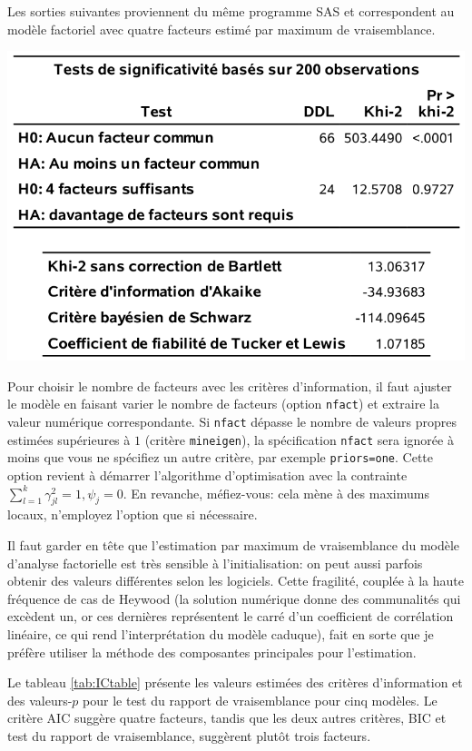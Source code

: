 \documentclass[
  11pt,
  letterpaper,
]{book}
\theoremstyle{definition}
\theoremstyle{definition}
\theoremstyle{definition}
\theoremstyle{definition}
\theoremstyle{remark}
\begin{document}
Les sorties suivantes proviennent du même programme SAS et correspondent au modèle factoriel avec quatre facteurs estimé par maximum de vraisemblance.

\begin{center}\includegraphics[width=0.7\linewidth]{figures/01-facto-e4} \end{center}

Pour choisir le nombre de facteurs avec les critères d'information, il faut ajuster le modèle en faisant varier le nombre de facteurs (option \texttt{nfact}) et extraire la valeur numérique correspondante. Si \texttt{nfact} dépasse le nombre de valeurs propres estimées supérieures à \(1\) (critère \texttt{mineigen}), la spécification \texttt{nfact} sera ignorée à moins que vous ne spécifiez un autre critère, par exemple \texttt{priors=one}. Cette option revient à démarrer l'algorithme d'optimisation avec la contrainte \(\sum_{l=1}^k \gamma_{jl}^2=1, \psi_j=0\). En revanche, méfiez-vous: cela mène à des maximums locaux, n'employez l'option que si nécessaire.

Il faut garder en tête que l'estimation par maximum de vraisemblance du modèle d'analyse factorielle est très sensible à l'initialisation: on peut aussi parfois obtenir des valeurs différentes selon les logiciels. Cette fragilité, couplée à la haute fréquence de cas de Heywood (la solution numérique donne des communalités qui excèdent un, or ces dernières représentent le carré d'un coefficient de corrélation linéaire, ce qui rend l'interprétation du modèle caduque), fait en sorte que je préfère utiliser la méthode des composantes principales pour l'estimation.

Le tableau \ref{tab:ICtable} présente les valeurs estimées des critères d'information et des valeurs-\(p\) pour le test du rapport de vraisemblance pour cinq modèles. Le critère AIC suggère quatre facteurs, tandis que les deux autres critères, BIC et test du rapport de vraisemblance, suggèrent plutôt trois facteurs.
\end{document}
